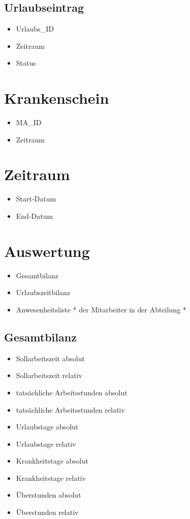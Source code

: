 \subsection{Urlaubseintrag}
\begin{itemize}[label=+]
\item[] Urlaubs\_ID
\item Zeitraum
\item Status
\end{itemize}
\section{Krankenschein}
\begin{itemize}[label=+]
\item[] MA\_ID
\item Zeitraum
\end{itemize}
\section{Zeitraum}
\begin{itemize}[label=+]
\item[] Start-Datum
\item End-Datum
\end{itemize}
\section{Auswertung}
\begin{itemize}[label=+]
\item[] Gesamtbilanz
\item Urlaubszeitbilanz
\item Anwesenheitsliste * der Mitarbeiter in der Abteilung *
\end{itemize}

\subsection{Gesamtbilanz}
\begin{itemize}[label=+]
\item[] Sollarbeitszeit absolut
\item Sollarbeitszeit relativ
\item tatsächliche Arbeitsstunden absolut
\item tatsächliche Arbeitsstunden relativ
\item Urlaubstage absolut
\item Urlaubstage relativ
\item Krankheitstage absolut
\item Krankheitstage relativ
\item Überstunden absolut
\item Überstunden relativ
\end{itemize}

